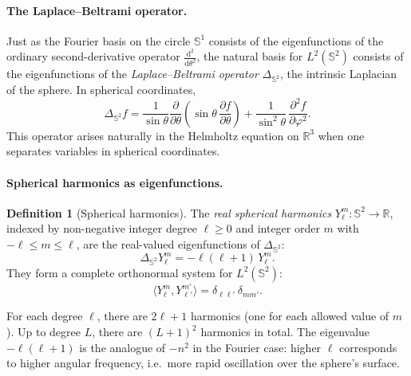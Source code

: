 \documentclass[11pt,a4paper]{article}
\theoremstyle{plain}
\theoremstyle{definition}
\newtheorem{definition}[theorem]{Definition}
\theoremstyle{remark}
\newcommand{\dd}{\mathrm{d}}
\begin{document}
\paragraph{The Laplace--Beltrami operator.}
Just as the Fourier basis on the circle $\mathbb{S}^1$ consists of
the eigenfunctions of the ordinary second-derivative operator
$\frac{\dd^2}{\dd\theta^2}$, the natural basis for $L^2(\mathbb{S}^2)$
consists of the eigenfunctions of the \emph{Laplace--Beltrami operator}
$\Delta_{\mathbb{S}^2}$, the intrinsic Laplacian of the sphere. In
spherical coordinates,
\begin{equation}
  \Delta_{\mathbb{S}^2} f
  = \frac{1}{\sin\theta}
    \frac{\partial}{\partial\theta}
    \!\left(\sin\theta\,\frac{\partial f}{\partial\theta}\right)
  + \frac{1}{\sin^2\!\theta}\,
    \frac{\partial^2 f}{\partial\varphi^2}.
  \label{eq:lbo}
\end{equation}
This operator arises naturally in the Helmholtz equation on
$\mathbb{R}^3$ when one separates variables in spherical coordinates.

\paragraph{Spherical harmonics as eigenfunctions.}
\begin{definition}[Spherical harmonics]
\label{def:sh}
The \emph{real spherical harmonics} $Y_\ell^m : \mathbb{S}^2 \to \mathbb{R}$,
indexed by non-negative integer degree $\ell \geq 0$ and integer order
$m$ with $-\ell \leq m \leq \ell$, are the real-valued eigenfunctions
of $\Delta_{\mathbb{S}^2}$:
\begin{equation}
  \Delta_{\mathbb{S}^2} Y_\ell^m = -\ell(\ell+1)\,Y_\ell^m.
  \label{eq:sh_eigenvalue}
\end{equation}
They form a complete orthonormal system for $L^2(\mathbb{S}^2)$:
\[
  \langle Y_\ell^m, Y_{\ell'}^{m'} \rangle
  = \delta_{\ell\ell'}\,\delta_{mm'}.
\]
\end{definition}

For each degree $\ell$, there are $2\ell + 1$ harmonics (one for
each allowed value of $m$). Up to degree $L$, there are
$(L+1)^2$ harmonics in total. The eigenvalue $-\ell(\ell+1)$ is the
analogue of $-n^2$ in the Fourier case: higher $\ell$ corresponds to
higher angular frequency, i.e.\ more rapid oscillation over the
sphere's surface.
\end{document}
